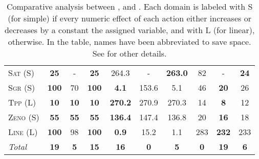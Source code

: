 \documentclass[11pt]{article}
\begin{document}
\begin{table*}[tb]
{\begin{tabular}{|l||ccc||ccc||ccc||}
\textsc{Sat} (S)&\textbf{25}&-&\textbf{25}&264.3&-&\textbf{263.0}&82&-&\textbf{24}\\
\textsc{Sgr} (S)&\textbf{100}&70&\textbf{100}&\textbf{4.1}&153.6&5.1&46&\textbf{20}&26\\
\textsc{Tpp} (L)&\textbf{10}&\textbf{10}&\textbf{10}&\textbf{270.2}&270.9&270.3&14&\textbf{8}&12\\
\textsc{Zeno} (S)&\textbf{55}&\textbf{55}&\textbf{55}&\textbf{136.4}&147.4&136.8&20&\textbf{16}&18\\
\textsc{Line} (L)&\textbf{100}&98&\textbf{100}&\textbf{0.9}&15.2&1.1&283&\textbf{232}&233
\\\hline
\textit{Total}&\textbf{19}&\textbf{5}&\textbf{15}&\textbf{16}&\textbf{0}&\textbf{5}&\textbf{0}&\textbf{19}&\textbf{6}\\\hline

        \end{tabular}}
        \caption{Comparative analysis between  \pattye, \pattym and \pattyi. Each domain is labeled with S (for simple) if every numeric effect of each action either increases or decreases by a constant the assigned variable, and with L (for linear), otherwise. In the table, names have been abbreviated to save space.  See \cite{ipc2023} for other details.}
        \label{tab:qual-plans}
        \end{table*}
        
\end{document}
